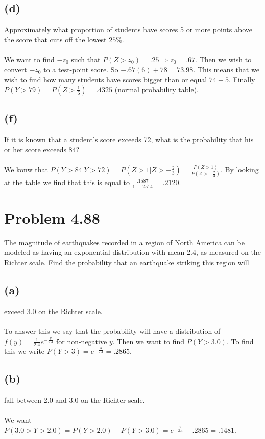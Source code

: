 \documentclass{article}
\theoremstyle{definition}
\begin{document}
    \subsection*{(d)}
        Approximately what proportion of students have scores 5 or more points above
        the score that cuts off the lowest $25\%$.\\\\
        We want to find $-z_0$ such that $P(Z > z_0) = .25 \Longrightarrow z_0 = .67$.
        Then we wish to convert $-z_0$ to a test-point score. So $-.67(6) + 78 = 73.98$.
        This means that we wish to find how many students have scores bigger than or equal
        $74 + 5$. Finally $P(Y > 79) = P(Z > \frac{1}{6}) = .4325$ (normal probability table).

    \subsection*{(f)}
        If it is known that a student's score exceeds 72, what is the probability 
        that his or her score exceeds 84?\\\\
        We konw that $P(Y > 84 | Y > 72) = P(Z > 1 | Z > -\frac{2}{3}) = \frac{P(Z > 1)}
        {P(Z > -\frac{2}{3})}$. By looking at the table we find that this is equal to 
        $\frac{.1587}{1 - .2514} = .2120$.

\section*{Problem 4.88}
The magnitude of earthquakes recorded in a region of North America can be modeled
 as having an exponential distribution with mean 2.4, as measured on the Richter 
 scale. Find the probability that an earthquake striking this region will
    
    \subsection*{(a)}
        exceed 3.0 on the Richter scale.\\\\
        To answer this we say that the probability will have a distribution of 
        $f(y) = \frac{1}{2.4}e^{-\frac{y}{2.4}}$ for non-negative $y$. Then we want to 
        find $P(Y > 3.0)$. To find this we write $P(Y > 3) = e^{-\frac{3}{2.4}} = .2865$.

    \subsection*{(b)}
        fall between 2.0 and 3.0 on the Richter scale.\\\\
        We want $P(3.0 > Y > 2.0) = P(Y > 2.0) - P(Y > 3.0) = e^{-\frac{2}{2.4}} - .2865
         = .1481$.
\end{document}
